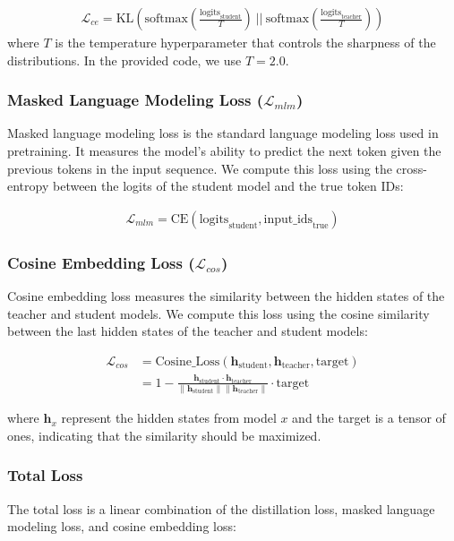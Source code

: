 \documentclass{article} %
\begin{document}
\begin{align}
\mathcal{L}_{ce} = \text{KL} \left( \text{softmax}\left(\frac{\text{logits}_{\text{student}}}{T}\right) \ || \ \text{softmax}\left(\frac{\text{logits}_{\text{teacher}}}{T}\right) \right)
\end{align}
where $T$ is the temperature hyperparameter that controls the sharpness of the distributions. In the provided code, we use $T=2.0$. 

\subsubsection{Masked Language Modeling Loss ($\mathcal{L}_{mlm}$)}
Masked language modeling loss is the standard language modeling loss used in pretraining. It measures the model's ability to predict the next token given the previous tokens in the input sequence. We compute this loss using the cross-entropy between the logits of the student model and the true token IDs:

\begin{align}
\mathcal{L}_{mlm} = \text{CE} \left( \text{logits}_{\text{student}}, \text{input\_ids}_{\text{true}} \right)
\end{align}

\subsubsection{Cosine Embedding Loss ($\mathcal{L}_{cos}$)}
Cosine embedding loss measures the similarity between the hidden states of the teacher and student models. We compute this loss using the cosine similarity between the last hidden states of the teacher and student models:

\begin{align}
\mathcal{L}_{cos} &= \text{Cosine\_Loss} \left( \mathbf{h}_{\text{student}}, \mathbf{h}_{\text{teacher}}, \text{target} \right) \\
                  &= 1 - \frac{\mathbf{h}_{\text{student}} \cdot \mathbf{h}_{\text{teacher}}}{\left\lVert \mathbf{h}_{\text{student}}\right\rVert \left\lVert \mathbf{h}_{\text{teacher}}\right\rVert} \cdot \text{target}
\end{align}

where $\mathbf{h}_{x}$ represent the hidden states from model $x$ and the target is a tensor of ones, indicating that the similarity should be maximized.

\subsubsection{Total Loss}
The total loss is a linear combination of the distillation loss, masked language modeling loss, and cosine embedding loss:
\end{document}
